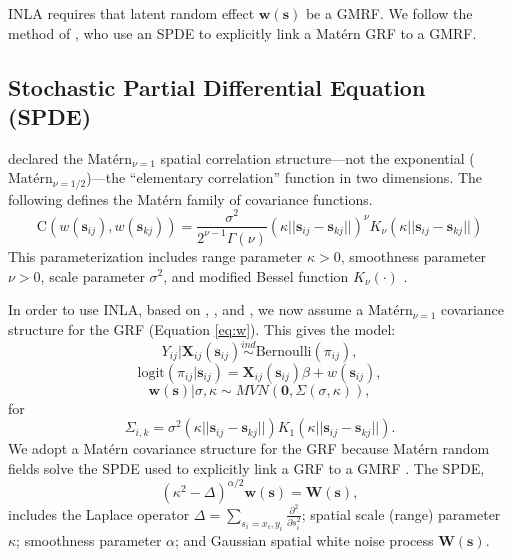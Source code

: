 INLA requires that latent random effect $\pmb{w}(\pmb{s})$ be a GMRF. We follow the method of \cite{Lindgren2011}, who use an SPDE to explicitly link a Mat\'ern GRF to a GMRF. 

\subsection{Stochastic Partial Differential Equation (SPDE)} \label{SPDE}

\cite{Whittle1954} declared the $\text{Mat\'ern}_{\nu = 1}$ spatial correlation structure---not the exponential ($\text{Mat\'ern}_{\nu = 1/2}$)---the ``elementary correlation'' function in two dimensions. The following defines the Mat\'ern family of covariance functions.
$$\text{C}\left(w(\pmb{s}_{ij}), w(\pmb{s}_{kj}) \right)= \frac{\sigma^{2}}{2^{\nu - 1}\Gamma(\nu)}(\kappa ||\pmb{s}_{ij} - \pmb{s}_{kj}||)^{\nu}K_{\nu}(\kappa ||\pmb{s}_{ij} - \pmb{s}_{kj}||)$$
This parameterization includes range parameter $\kappa > 0$, smoothness parameter $\nu > 0$, scale parameter $\sigma^{2}$, and modified Bessel function $K_{\nu}(\cdot)$ \citep{Schabenberger2004}.

In order to use INLA, based on \cite{Whittle1954}, \cite{Mondal2017}, and \cite{Lindgren2015}, we now assume a $\text{Mat\'ern}_{\nu = 1}$ covariance structure for the GRF (Equation \ref{eq:w}). This gives the model:
$$ Y_{ij}|\mathbf{X}_{ij}(\mathbf{s}_{ij}) \stackrel{ind}{\sim} \mbox{Bernoulli}(\pi_{ij}), $$
$$ \text{logit}(\pi_{ij}|\pmb{s}_{ij}) = \mathbf{X}_{ij}(\mathbf{s}_{ij})\beta + w(\pmb{s}_{ij}), $$
$$ \pmb{w}(\pmb{s}) | \sigma, \kappa \sim MVN(\pmb{0}, \Sigma(\sigma, \kappa)), $$
for
\begin{equation}
\Sigma_{i,k} = \sigma^{2}(\kappa ||\pmb{s}_{ij} - \pmb{s}_{kj}||)K_{1}(\kappa ||\pmb{s}_{ij} - \pmb{s}_{kj}||).
\end{equation}
We adopt a Mat\'ern covariance structure for the GRF because  Mat\'ern random fields solve the SPDE used to explicitly link a GRF to a GMRF \citep{Whittle1954}. The SPDE,
\begin{equation} \label{eq:spde1}
(\kappa^{2} - \Delta)^{\alpha/2}\pmb{w}(\pmb{s}) = \pmb{W}(\pmb{s}),
\end{equation}
includes the Laplace operator $\Delta = \sum_{s_{i}=x_{i},y_{i}} \frac{\partial^{2}}{\partial s_{i}^{2}}$; spatial scale (range) parameter $\kappa$; smoothness parameter $\alpha$; and Gaussian spatial white noise process $\pmb{W}(\pmb{s})$. 


